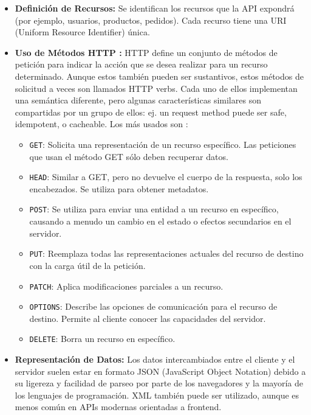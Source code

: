 \begin{itemize}
    \item \textbf{Definici\'{o}n de Recursos:} Se identifican los recursos que la API expondr\'{a} (por ejemplo, usuarios, productos, pedidos). Cada recurso tiene una URI (Uniform Resource Identifier) \'{u}nica.
    \item \textbf{Uso de M\'{e}todos HTTP \cite{MDNHTTPMethods2025}:} HTTP define un conjunto de métodos de petición para indicar la acción que se desea realizar para un recurso determinado. Aunque estos también pueden ser sustantivos, estos métodos de solicitud a veces son llamados HTTP verbs. Cada uno de ellos implementan una semántica diferente, pero algunas características similares son compartidas por un grupo de ellos: ej. un request method puede ser safe, idempotent, o cacheable.
    \newline\newline
    Los más usados son :
    \begin{itemize}
        \item \texttt{GET}: Solicita una representación de un recurso específico. Las peticiones que usan el método GET sólo deben recuperar datos.
        \item \texttt{HEAD}: Similar a GET, pero no devuelve el cuerpo de la respuesta, solo los encabezados. Se utiliza para obtener metadatos.
        \item \texttt{POST}: Se utiliza para enviar una entidad a un recurso en específico, causando a menudo un cambio en el estado o efectos secundarios en el servidor.
        \item \texttt{PUT}: Reemplaza todas las representaciones actuales del recurso de destino con la carga útil de la petición.
        \item \texttt{PATCH}: Aplica modificaciones parciales a un recurso.
        \item \texttt{OPTIONS}: Describe las opciones de comunicación para el recurso de destino. Permite al cliente conocer las capacidades del servidor.
        \item \texttt{DELETE}: Borra un recurso en específico.
    \end{itemize}
    \item \textbf{Representaci\'{o}n de Datos:} Los datos intercambiados entre el cliente y el servidor suelen estar en formato JSON (JavaScript Object Notation) debido a su ligereza y facilidad de parseo por parte de los navegadores y la mayor\'{i}a de los lenguajes de programaci\'{o}n. XML tambi\'{e}n puede ser utilizado, aunque es menos com\'{u}n en APIs modernas orientadas a frontend.

\end{itemize}
